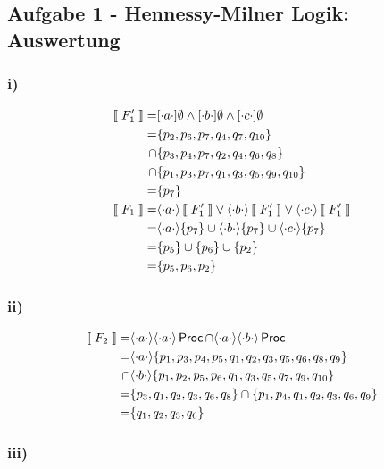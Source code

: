 \subsection*{Aufgabe 1 - Hennessy-Milner Logik: Auswertung}

\subsubsection*{i)}

\begin{align*}
\left \llbracket \; F_1^\prime \; \right \rrbracket
	=& [ \cdot a \cdot ]  \emptyset \land [ \cdot b \cdot ]  \emptyset \land [ \cdot c \cdot ]  \emptyset\\
	=& \{p_2, p_6, p_7, q_4, q_7, q_{10} \}\\
	\cap& \{p_3, p_4, p_7, q_2, q_4, q_6, q_8\}\\
	\cap& \{p_1, p_3, p_7, q_1, q_3, q_5, q_9, q_{10} \}\\
	=& \{p_7\}\\
\left \llbracket \; F_1 \; \right \rrbracket
	=& \langle \cdot a \cdot \rangle\left \llbracket \; F_1^\prime \; \right \rrbracket \lor \langle \cdot b \cdot \rangle\left \llbracket \; F_1^\prime \; \right \rrbracket \lor \langle \cdot c \cdot \rangle\left \llbracket \; F_1^\prime \; \right \rrbracket\\
	=& \langle \cdot a \cdot \rangle\{p_7\} \cup \langle \cdot b \cdot \rangle\{p_7\} \cup \langle \cdot c \cdot \rangle\{p_7\}\\
	=& \{p_5\} \cup \{p_6\} \cup\{p_2\}\\
	=& \{p_5, p_6, p_2\}\\
\end{align*}
 
\subsubsection*{ii)}

\begin{align*}
\left \llbracket \; F_2 \; \right \rrbracket
	=& \langle \cdot a \cdot \rangle\langle \cdot a \cdot \rangle\operatorname{\sf Proc} \cap \langle \cdot a \cdot \rangle\langle \cdot b \cdot \rangle\operatorname{\sf Proc}\\
	=& \langle \cdot a \cdot \rangle\{p_1,p_3,p_4,p_5,q_1,q_2,q_3,q_5,q_6,q_8,q_9\}\\
	\cap& \langle \cdot b \cdot \rangle\{p_1,p_2,p_5,p_6,q_1,q_3,q_5,q_7,q_9,q_{10}\}\\
	=& \{p_3,q_1,q_2,q_3,q_6,q_8\} \cap \{p_1,p_4,q_1,q_2,q_3,q_6,q_9\}\\
	=& \{q_1,q_2,q_3,q_6\}
\end{align*}

\subsubsection*{iii)}

